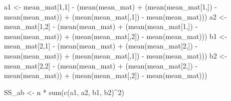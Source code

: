 \documentclass[
]{book}
\newenvironment{Shaded}{\begin{snugshade}}{\end{snugshade}}
\newcommand{\DecValTok}[1]{\textcolor[rgb]{0.00,0.00,0.81}{#1}}
\newcommand{\FunctionTok}[1]{\textcolor[rgb]{0.00,0.00,0.00}{#1}}
\newcommand{\NormalTok}[1]{#1}
\newcommand{\OtherTok}[1]{\textcolor[rgb]{0.56,0.35,0.01}{#1}}
\newcommand{\SpecialCharTok}[1]{\textcolor[rgb]{0.00,0.00,0.00}{#1}}
\begin{document}
\begin{Shaded}
\begin{Highlighting}[]
\NormalTok{a1 }\OtherTok{\textless{}{-}}\NormalTok{ mean\_mat[}\DecValTok{1}\NormalTok{,}\DecValTok{1}\NormalTok{] }\SpecialCharTok{{-}}\NormalTok{ (}\FunctionTok{mean}\NormalTok{(mean\_mat) }\SpecialCharTok{+} 
\NormalTok{                         (}\FunctionTok{mean}\NormalTok{(mean\_mat[}\DecValTok{1}\NormalTok{,]) }\SpecialCharTok{{-}} \FunctionTok{mean}\NormalTok{(mean\_mat)) }\SpecialCharTok{+} 
\NormalTok{                         (}\FunctionTok{mean}\NormalTok{(mean\_mat[,}\DecValTok{1}\NormalTok{]) }\SpecialCharTok{{-}} \FunctionTok{mean}\NormalTok{(mean\_mat)))}
\NormalTok{a2 }\OtherTok{\textless{}{-}}\NormalTok{ mean\_mat[}\DecValTok{1}\NormalTok{,}\DecValTok{2}\NormalTok{] }\SpecialCharTok{{-}}\NormalTok{ (}\FunctionTok{mean}\NormalTok{(mean\_mat) }\SpecialCharTok{+} 
\NormalTok{                         (}\FunctionTok{mean}\NormalTok{(mean\_mat[}\DecValTok{1}\NormalTok{,]) }\SpecialCharTok{{-}} \FunctionTok{mean}\NormalTok{(mean\_mat)) }\SpecialCharTok{+} 
\NormalTok{                         (}\FunctionTok{mean}\NormalTok{(mean\_mat[,}\DecValTok{2}\NormalTok{]) }\SpecialCharTok{{-}} \FunctionTok{mean}\NormalTok{(mean\_mat)))}
\NormalTok{b1 }\OtherTok{\textless{}{-}}\NormalTok{ mean\_mat[}\DecValTok{2}\NormalTok{,}\DecValTok{1}\NormalTok{] }\SpecialCharTok{{-}}\NormalTok{ (}\FunctionTok{mean}\NormalTok{(mean\_mat) }\SpecialCharTok{+} 
\NormalTok{                         (}\FunctionTok{mean}\NormalTok{(mean\_mat[}\DecValTok{2}\NormalTok{,]) }\SpecialCharTok{{-}} \FunctionTok{mean}\NormalTok{(mean\_mat)) }\SpecialCharTok{+} 
\NormalTok{                         (}\FunctionTok{mean}\NormalTok{(mean\_mat[,}\DecValTok{1}\NormalTok{]) }\SpecialCharTok{{-}} \FunctionTok{mean}\NormalTok{(mean\_mat)))}
\NormalTok{b2 }\OtherTok{\textless{}{-}}\NormalTok{ mean\_mat[}\DecValTok{2}\NormalTok{,}\DecValTok{2}\NormalTok{] }\SpecialCharTok{{-}}\NormalTok{ (}\FunctionTok{mean}\NormalTok{(mean\_mat) }\SpecialCharTok{+} 
\NormalTok{                         (}\FunctionTok{mean}\NormalTok{(mean\_mat[}\DecValTok{2}\NormalTok{,]) }\SpecialCharTok{{-}} \FunctionTok{mean}\NormalTok{(mean\_mat)) }\SpecialCharTok{+} 
\NormalTok{                         (}\FunctionTok{mean}\NormalTok{(mean\_mat[,}\DecValTok{2}\NormalTok{]) }\SpecialCharTok{{-}} \FunctionTok{mean}\NormalTok{(mean\_mat)))}

\NormalTok{SS\_ab }\OtherTok{\textless{}{-}}\NormalTok{ n }\SpecialCharTok{*} \FunctionTok{sum}\NormalTok{(}\FunctionTok{c}\NormalTok{(a1, a2, b1, b2)}\SpecialCharTok{\^{}}\DecValTok{2}\NormalTok{)}
\end{Highlighting}
\end{Shaded}
\end{document}
